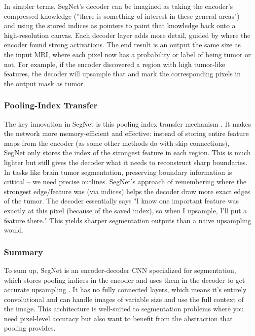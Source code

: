 In simpler terms, SegNet's decoder can be imagined as taking the encoder's compressed knowledge ("there is something of interest in these general areas") and using the stored indices as pointers to paint that knowledge back onto a high-resolution canvas. Each decoder layer adds more detail, guided by where the encoder found strong activations. The end result is an output the same size as the input MRI, where each pixel now has a probability or label of being tumor or not. For example, if the encoder discovered a region with high tumor-like features, the decoder will upsample that and mark the corresponding pixels in the output mask as tumor.

\subsubsection{Pooling-Index Transfer}
\label{sec:pooling_index_transfer}

The key innovation in SegNet is this pooling index transfer mechanism \cite{paperswithcode2023segnet}. It makes the network more memory-efficient and effective: instead of storing entire feature maps from the encoder (as some other methods do with skip connections), SegNet only stores the index of the strongest feature in each region. This is much lighter but still gives the decoder what it needs to reconstruct sharp boundaries. In tasks like brain tumor segmentation, preserving boundary information is critical – we need precise outlines. SegNet's approach of remembering where the strongest edge/feature was (via indices) helps the decoder draw more exact edges of the tumor. The decoder essentially says "I know one important feature was exactly at this pixel (because of the saved index), so when I upsample, I'll put a feature there." This yields sharper segmentation outputs than a naive upsampling would.

\subsubsection{Summary}
\label{sec:segnet_summary}

To sum up, SegNet is an encoder-decoder CNN specialized for segmentation, which stores pooling indices in the encoder and uses them in the decoder to get accurate upsampling \cite{paperswithcode2023segnet}. It has no fully connected layers, which means it's entirely convolutional and can handle images of variable size and use the full context of the image. This architecture is well-suited to segmentation problems where you need pixel-level accuracy but also want to benefit from the abstraction that pooling provides.

